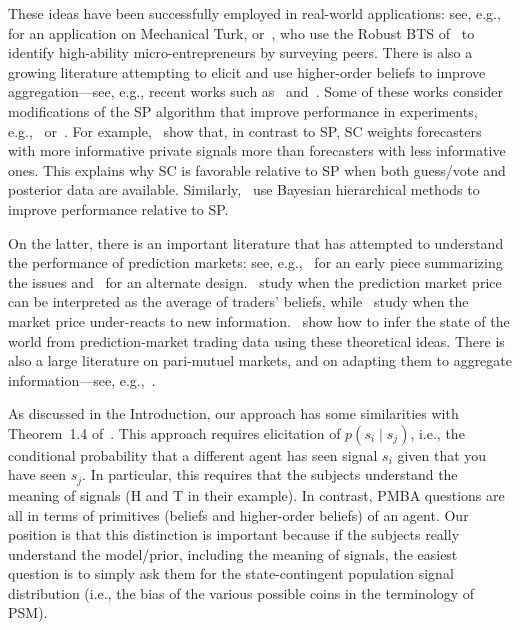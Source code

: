 \documentclass[12pt,reqno]{amsart}
\begin{document}
These ideas have  been successfully employed in real-world applications: see, e.g.,~\cite{shaw2011designing} for an application on Mechanical Turk, or~\cite{rigol2017targeting}, who use the Robust BTS of~\cite{witkowski2012robust} to identify high-ability micro-entrepreneurs by surveying peers. There is also a growing literature attempting to elicit and use higher-order beliefs to improve aggregation---see, e.g., recent works such as~\cite{palley2019extracting} and~\cite{palley2020boosting}. Some of these works consider modifications of the SP algorithm that improve performance in experiments, e.g.,~\cite{doi:10.1287/mnsc.2020.3919} or~\cite{10.1371/journal.pone.0232058}. For example,~\cite{doi:10.1287/mnsc.2020.3919} show that, in contrast to SP, SC weights forecasters with more informative private signals more than forecasters with less informative ones. This explains why SC is favorable relative to SP when both guess/vote and posterior data are available. Similarly,~\cite{mccoyprelecms} use Bayesian hierarchical methods to improve performance relative to SP.

On the latter, there is an important literature that has attempted to understand the performance of prediction markets: see, e.g.,~\cite{wolfers2004prediction} for an early piece summarizing the issues and~\cite{baillon2017bayesian} for an alternate design.~\cite{wolfers2006prediction} study when the prediction market price can be interpreted as the average of traders' beliefs, while~\cite{ottaviani2015price} study when the market price under-reacts to new information.~\cite{dai2020wisdom} show how to infer the state of the world from prediction-market trading data using these theoretical ideas. There is also a large literature on pari-mutuel markets, and on adapting them to aggregate information---see, e.g.,~\cite{pennock2004dynamic}.

As discussed in the Introduction, our approach has some similarities with Theorem~1.4 of~\cite{prelec2017solution}. This approach requires elicitation of $p(s_i\mid s_j)$, i.e., the conditional probability that a different agent has seen signal $s_i$ given that you have seen $s_j$. In particular, this requires that the subjects understand the meaning of signals (H and T in their example). In contrast, PMBA questions are all in terms of primitives (beliefs and higher-order beliefs) of an agent. Our position is that this distinction is important because if the subjects really understand the model/prior, including the meaning of signals, the easiest question is to simply ask them for the state-contingent population signal distribution (i.e., the bias of the various possible coins in the terminology of PSM).
\end{document}
